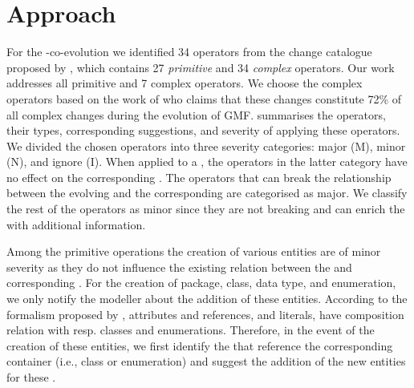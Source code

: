 \section{Approach} 
\label{sec:Approach}

For the \metamodel-\viewtype co-evolution we identified 34 operators from the change catalogue proposed by \cite{herrmannsdoerfer_extensive_2011}, which contains 27 \textit{primitive} and 34 \textit{complex} operators. Our work addresses all primitive and 7 complex operators. We choose the complex operators based on the work of \cite{khelladi_detecting_2015} who claims that these changes constitute 72\% of all complex changes during the evolution of GMF.  summarises the operators, their types, corresponding suggestions, and severity of applying these operators. We divided the chosen operators into three severity categories: major (M), minor (N), and ignore (I).
When applied to a \metamodel, the operators in the latter category have no effect on the corresponding \viewtypes. The operators that can break the relationship between the evolving \metamodel and the corresponding \viewtypes are categorised as major. We classify the rest of the operators as minor since they are not breaking and can enrich the \viewtypes with additional information.

Among the primitive operations the creation of various entities are of minor severity as they do not influence the existing relation between the \metamodel and corresponding \viewtypes. For the creation of package, class, data type, and enumeration, we only notify the modeller about the addition of these entities. 
According to the \metamodeling formalism proposed by \cite{herrmannsdoerfer_extensive_2011}, attributes and references, and literals, have composition relation with resp. classes and enumerations. Therefore, in the event of the creation of these entities, we first identify the \viewtypes that reference the corresponding container (i.e., class or enumeration) and suggest the addition of the new entities for these \viewtypes.

